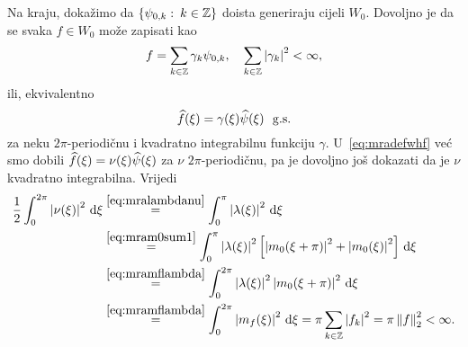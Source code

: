 \documentclass[main.tex]{subfiles}
\begin{document}
Na kraju, dokažimo da \( \left\{ \psi_{0,k} \, \colon \, k \in \mathbb{Z} \right\} \)
doista generiraju cijeli \( W_0 \). Dovoljno je da se svaka \( f \in W_0 \)
može zapisati kao
\begin{equation}
	f = \sum_{k \in \mathbb{Z}} \gamma_k \psi_{0,k}, \quad \sum_{k \in \mathbb{Z}} \left| {\gamma_k} \right|^2 < \infty,
\end{equation}
ili, ekvivalentno
\begin{equation}
	\widehat{f}(\xi) = \gamma(\xi) \widehat{\psi}(\xi) \ \ \mathrm{g.s.}
\end{equation}
za neku \( 2\pi \)-periodičnu i kvadratno integrabilnu funkciju \( \gamma \).
U~\eqref{eq:mradefwhf} već smo dobili
\( \widehat{f}(\xi) = \nu(\xi) \widehat{\psi}(\xi) \) za \( \nu \) \( 2\pi \)-periodičnu,
pa je dovoljno još dokazati da je \( \nu \) kvadratno integrabilna.
Vrijedi
\begin{align}
	\frac 12 \int_0^{2\pi} \left| {\nu(\xi)} \right|^2 \,\mathrm d \xi & \stackrel{\scriptstyle {\eqref{eq:mralambdanu}}}{=} \int_0^\pi \left| {\lambda(\xi)} \right|^2 \,\mathrm d \xi \\
	                                               & \stackrel{\scriptstyle {\eqref{eq:mram0sum1}}}{=}
	\int_0^\pi \left| {\lambda(\xi)} \right|^2 \left[ \left| {m_0(\xi + \pi)} \right|^2 + \left| {m_0(\xi)} \right|^2 \right] \,\mathrm d \xi                             \\
	                                               & \stackrel{\scriptstyle {\eqref{eq:mramflambda}}}{=}
	\int_0^{2\pi} \left| {\lambda(\xi)} \right|^2 \left| {m_0(\xi + \pi)} \right|^2 \,\mathrm d \xi                                                            \\
	                                               & \stackrel{\scriptstyle {\eqref{eq:mramflambda}}}{=}
	\int_0^{2\pi} \left| {m_f(\xi)} \right|^2 \,\mathrm d \xi = \pi \sum_{k \in \mathbb{Z}} \left| {f_k} \right|^2 = \pi \left\lVert f\right\rVert_2^2 < \infty.
\end{align}
\end{document}
